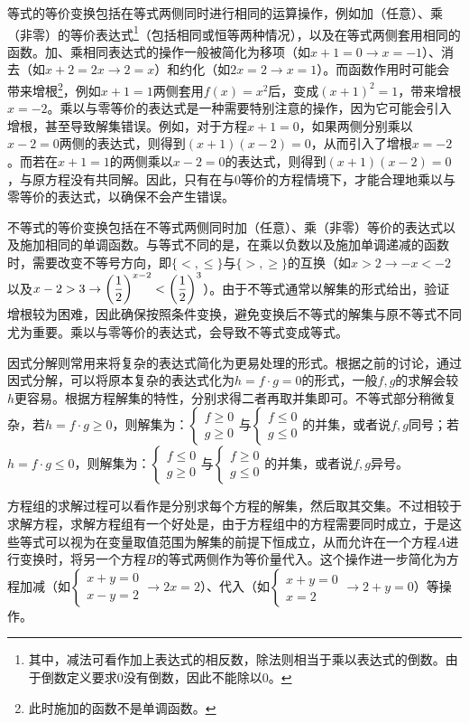 等式的等价变换包括在等式两侧同时进行相同的运算操作，例如加（任意）、乘（非零）的等价表达式\footnote{其中，减法可看作加上表达式的相反数，除法则相当于乘以表达式的倒数。由于倒数定义要求$0$没有倒数，因此不能除以$0$。}（包括相同或恒等两种情况），以及在等式两侧套用相同的函数。加、乘相同表达式的操作一般被简化为移项（如$x+1=0\to x=-1$）、消去（如$x+2=2x\to 2=x$）和约化（如$2x=2\to x=1$）。而函数作用时可能会带来增根\footnote{此时施加的函数不是单调函数。}，例如$x+1=1$两侧套用$f(x)=x^2$后，变成$(x+1)^2=1$，带来增根$x=-2$。乘以与零等价的表达式是一种需要特别注意的操作，因为它可能会引入增根，甚至导致解集错误。例如，对于方程$x+1=0$，如果两侧分别乘以$x-2=0$两侧的表达式，则得到$(x+1)(x-2)=0$，从而引入了增根$x=-2$。而若在$x+1=1$的两侧乘以$x-2=0$的表达式，则得到$(x+1)(x-2)=0$，与原方程没有共同解。因此，只有在与$0$等价的方程情境下，才能合理地乘以与零等价的表达式，以确保不会产生错误。

不等式的等价变换包括在不等式两侧同时加（任意）、乘（非零）等价的表达式以及施加相同的单调函数。与等式不同的是，在乘以负数以及施加单调递减的函数时，需要改变不等号方向，即$\{<,\leq\}$与$\{>,\geq\}$的互换（如$x>2\to-x<-2$以及$\displaystyle x-2>3\to\left({1\over2}\right)^{x-2}<\left({1\over2}\right)^3$）。由于不等式通常以解集的形式给出，验证增根较为困难，因此确保按照条件变换，避免变换后不等式的解集与原不等式不同尤为重要。乘以与零等价的表达式，会导致不等式变成等式。

因式分解则常用来将复杂的表达式简化为更易处理的形式。根据之前的讨论，通过因式分解，可以将原本复杂的表达式化为$h=f\cdot g=0$的形式，一般$f,g$的求解会较$h$更容易。根据方程解集的特性，分别求得二者再取并集即可。不等式部分稍微复杂，若$h=f\cdot g\geq0$，则解集为：$\begin{cases}f \geq 0 \\ g \geq 0\end{cases}$与$\begin{cases}f \leq 0 \\ g \leq 0\end{cases}$的并集，或者说$f,g$同号；若$h=f\cdot g\leq0$，则解集为：$\begin{cases}f \leq 0 \\ g \geq 0\end{cases}$与$\begin{cases}f \geq 0 \\ g \leq 0\end{cases}$的并集，或者说$f,g$异号。

方程组的求解过程可以看作是分别求每个方程的解集，然后取其交集。不过相较于求解方程，求解方程组有一个好处是，由于方程组中的方程需要同时成立，于是这些等式可以视为在变量取值范围为解集的前提下恒成立，从而允许在一个方程$A$进行变换时，将另一个方程$B$的等式两侧作为等价量代入。这个操作进一步简化为方程加减（如$\begin{cases}x+y= 0 \\ x-y =2\end{cases}\to 2x=2$）、代入（如$\begin{cases}x+y= 0 \\ x=2\end{cases}\to 2+y=0$）等操作。

